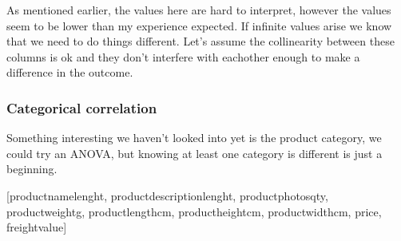 \documentclass[letterpaper,10pt,english]{jupyterBook}
\begin{document}
\sphinxAtStartPar
As mentioned earlier, the values here are hard to interpret, however the values seem to be lower than my experience expected. If infinite values arise we know that we need to do things different. Let’s assume the collinearity between these columns is ok and they don’t interfere with eachother enough to make a difference in the outcome.


\subsubsection{Categorical correlation}
\label{\detokenize{c7_case_studies/Olist:categorical-correlation}}
\sphinxAtStartPar
Something interesting we haven’t looked into yet is the product category, we could try an ANOVA, but knowing at least one category is different is just a beginning.

\begin{sphinxVerbatim}[commandchars=\\\{\}]
\PYG{p}{[}  \PYG{p}{]}
\end{sphinxVerbatim}

\begin{sphinxVerbatim}[commandchars=\\\{\}]
\PYGZdq{}[\PYGZsq{}product\PYGZus{}name\PYGZus{}lenght\PYGZsq{}, \PYGZsq{}product\PYGZus{}description\PYGZus{}lenght\PYGZsq{}, \PYGZsq{}product\PYGZus{}photos\PYGZus{}qty\PYGZsq{}, \PYGZsq{}product\PYGZus{}weight\PYGZus{}g\PYGZsq{}, \PYGZsq{}product\PYGZus{}length\PYGZus{}cm\PYGZsq{}, \PYGZsq{}product\PYGZus{}height\PYGZus{}cm\PYGZsq{}, \PYGZsq{}product\PYGZus{}width\PYGZus{}cm\PYGZsq{}, \PYGZsq{}price\PYGZsq{}, \PYGZsq{}freight\PYGZus{}value\PYGZsq{}]\PYGZdq{}
\end{sphinxVerbatim}
\end{document}

